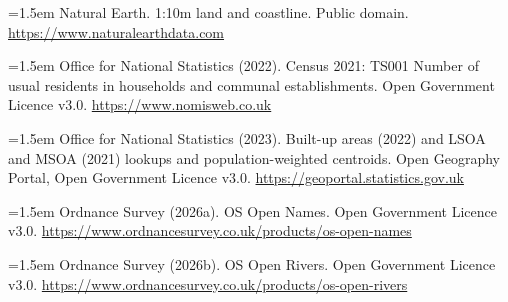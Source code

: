 \documentclass[11pt,a4paper]{article}
\begin{document}
\hangindent=1.5em Natural Earth. 1:10m land and coastline. Public domain. \url{https://www.naturalearthdata.com}

\hangindent=1.5em Office for National Statistics (2022). Census 2021: TS001 Number of usual residents in households and communal establishments. Open Government Licence v3.0. \url{https://www.nomisweb.co.uk}

\hangindent=1.5em Office for National Statistics (2023). Built-up areas (2022) and LSOA and MSOA (2021) lookups and population-weighted centroids. Open Geography Portal, Open Government Licence v3.0. \url{https://geoportal.statistics.gov.uk}

\hangindent=1.5em Ordnance Survey (2026a). OS Open Names. Open Government Licence v3.0. \url{https://www.ordnancesurvey.co.uk/products/os-open-names}

\hangindent=1.5em Ordnance Survey (2026b). OS Open Rivers. Open Government Licence v3.0. \url{https://www.ordnancesurvey.co.uk/products/os-open-rivers}
\end{document}
